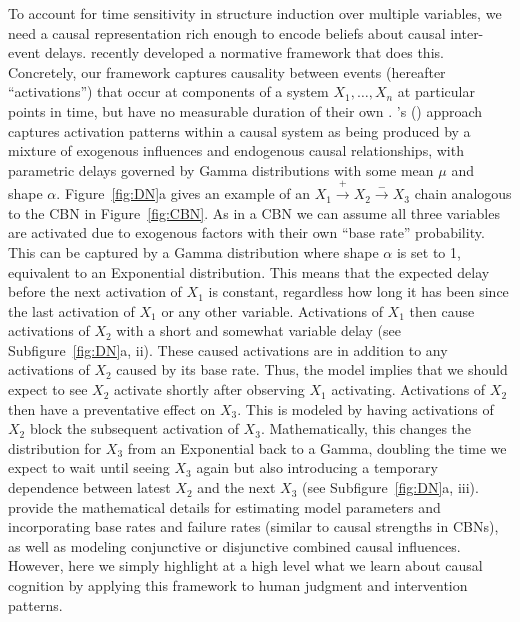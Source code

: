 \documentclass{cambridge7A}%
\def\citeapos#1{\citeauthor{#1}'s (\citeyear{#1})}
\begin{document}
To account for time sensitivity in structure induction over multiple variables, we need a causal representation rich enough to encode beliefs about causal inter-event delays.  %
\cite{bramley2018time} recently developed a normative framework that does this.  %
Concretely, our framework captures causality between events (hereafter ``activations'') that occur at components of a system $X_1,\ldots,X_n$ at particular points in time, but have no measurable duration of their own \citep{cox1980point}.  \citeapos{bramley2018time} approach captures activation patterns within a causal system as being produced by a mixture of exogenous influences and endogenous causal relationships, with parametric delays governed by Gamma distributions with some mean $\mu$ and shape $\alpha$. Figure~\ref{fig:DN}a gives an example of an  $X_1\!\stackrel{+}\rightarrow\!X_2\!\stackrel{-}\rightarrow\!X_3$ chain analogous to the CBN in Figure~\ref{fig:CBN}.  
As in a CBN we can assume all three variables are activated due to exogenous factors with their own ``base rate'' probability.  This can be captured by a Gamma distribution where shape $\alpha$ is set to 1, equivalent to an Exponential distribution.  %
This means that the expected delay before the next activation of $X_1$ is constant, regardless how long it has been since the last activation of $X_1$ or any other variable.  Activations of $X_1$ then cause activations of $X_2$ with a %
short and somewhat variable delay (see Subfigure~\ref{fig:DN}a, ii).  These caused activations are in addition to any activations of $X_2$ caused by its base rate.  Thus, the model implies that we should expect to see $X_2$ activate shortly after observing $X_1$ activating.  Activations of $X_2$ then have a preventative effect on $X_3$.  This is modeled by having activations of $X_2$ block the subsequent activation of $X_3$.  Mathematically, this changes the distribution for $X_3$ from an Exponential back to a Gamma, %
doubling the time we expect to wait until seeing $X_3$ again but also introducing a temporary dependence between latest $X_2$ and the next $X_3$ (see Subfigure~\ref{fig:DN}a, iii).  \cite{bramley2018time} provide the mathematical details for estimating model parameters and incorporating base rates and failure rates (similar to causal strengths in CBNs), as well as modeling conjunctive or disjunctive combined causal influences. However, here we simply highlight at a high level what we learn about causal cognition by applying this framework to human judgment and intervention patterns.  
\end{document}
